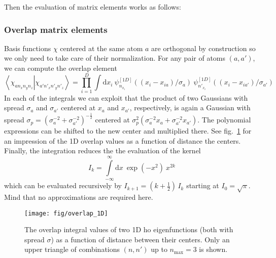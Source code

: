 \documentclass[oribibl]{llncs}
\newcommand{\um}[1]{_{\mathrm{#1}}}
\newcommand{\braket}[2]{\left\langle \left. #1 \right| #2 \right\rangle}
\begin{document}
Then the evaluation of matrix elements works as follows:

\subsubsection{Overlap matrix elements}
Basis functions $\chi$ centered at the same atom $a$ are orthogonal by construction
so we only need to take care of their normalization.
For any pair of atoms $(a,a')$, we can compute the overlap element
\begin{equation}
  \braket{ \chi_{a n_x n_y n_z} }{ \chi_{a' n'_x n'_y n'_z} } = \prod_{i=1}^D
  \int\mathrm d x_i \  \psi^{[1D]}_{n_{x_i}}((x_i - x_{ia})/\sigma_a)
                    \  \psi^{[1D]}_{n'_{x_i}}((x_i - x_{ia'})/\sigma_{a'})
  \label{eqn:overlap-factorized}
\end{equation}
In each of the integrals we can exploit that the product 
of two Gaussians with spread $\sigma_a$ and $\sigma_{a'}$ 
centered at $x_a$ and $x_{a'}$, respectively, 
is again a Gaussian with spread $\sigma_p = \left(\sigma_a^{-2} + \sigma_{a'}^{-2}\right)^{-\frac12}$
centered at $\sigma_p^2 \left( \sigma_a^{-2} x_a + \sigma_{a'}^{-2} x_{a'} \right)$.
The polynomial expressions can be shifted to the new center and multiplied there.
See fig.~\ref{fig:overlap_1D} for an impression of the 1D overlap values 
as a function of distance the centers.
Finally, the integration reduces the the evaluation of the kernel
\begin{equation}
  I_k = \int\limits_{-\infty}^{\infty} \mathrm d x \  \exp(-x^2) \  x^{2k}
  \label{eqn:gauss-integral-kernel}
\end{equation}
which can be evaluated recursively by $I_{k+1} = (k + \frac12)\,I_k$ starting at $I_0 = \sqrt{\pi}$.
Mind that no approximations are required here.
%
\begin{figure}
  \begin{minipage}[c]{.990\textwidth}
	\texttt{[image: fig/overlap\_1D]} %
  \end{minipage}\hfill
  \begin{minipage}[c]{.009\textwidth}
  \end{minipage}
  \label{fig:overlap_1D}
  \caption{
	The overlap integral values of two 1D \ac{ho} eigenfunctions (both with spread $\sigma$)
	as a function of distance between their centers.
	Only an upper triangle of combinations $(n,n')$ up to $n\um{max} = 3$ is shown.
  }
\end{figure}
%
%
\end{document}
